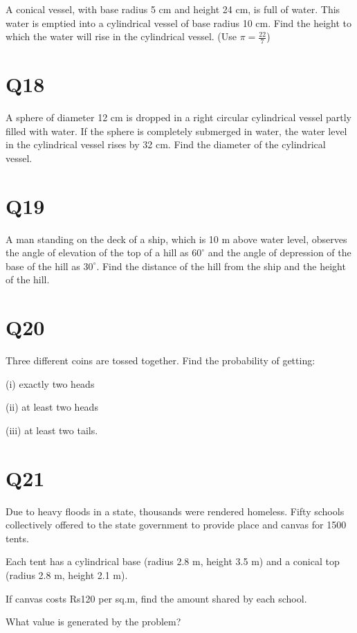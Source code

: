 \documentclass[12pt]{article}
\begin{document}
A conical vessel, with base radius 5 cm and height 24 cm, is full of water. This water is emptied into a cylindrical vessel of base radius 10 cm. Find the height to which the water will rise in the cylindrical vessel. (Use $\pi = \tfrac{22}{7}$)

\section*{Q18}

A sphere of diameter 12 cm is dropped in a right circular cylindrical vessel partly filled with water. If the sphere is completely submerged in water, the water level in the cylindrical vessel rises by 32 cm. Find the diameter of the cylindrical vessel.

\section*{Q19}

A man standing on the deck of a ship, which is 10 m above water level, observes the angle of elevation of the top of a hill as $60^\circ$ and the angle of depression of the base of the hill as $30^\circ$. Find the distance of the hill from the ship and the height of the hill.

\section*{Q20}

Three different coins are tossed together. Find the probability of getting:

(i) exactly two heads

(ii) at least two heads

(iii) at least two tails.

\section*{Q21}

Due to heavy floods in a state, thousands were rendered homeless. Fifty schools collectively offered to the state government to provide place and canvas for 1500 tents.

Each tent has a cylindrical base (radius 2.8 m, height 3.5 m) and a conical top (radius 2.8 m, height 2.1 m).

If canvas costs Rs120 per sq.m, find the amount shared by each school.

What value is generated by the problem?
\end{document}
